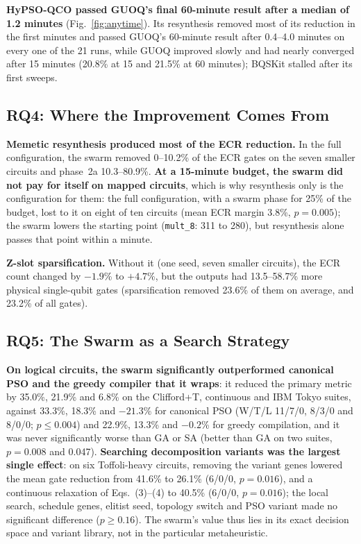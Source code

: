 \documentclass[conference,letterpaper]{IEEEtran}
\newcommand{\cir}[1]{\texttt{#1}}
\newcommand{\hypso}{HyPSO-QCO}
\begin{document}
\textbf{\hypso{} passed GUOQ's final 60-minute result after a median of 1.2 minutes} (Fig.~\ref{fig:anytime}).
Its resynthesis removed most of its reduction in the first minutes and passed GUOQ's 60-minute result after
0.4--4.0 minutes on every one of the 21 runs, while GUOQ improved slowly and had nearly converged after
15 minutes (20.8\% at 15 and 21.5\% at 60 minutes); BQSKit stalled after its first sweeps.

\subsection{RQ4: Where the Improvement Comes From}\label{sec:rq4}
\textbf{Memetic resynthesis produced most of the ECR reduction.} In the full configuration, the swarm removed
0--10.2\% of the ECR gates on the seven smaller circuits and phase~2a 10.3--80.9\%. \textbf{At a 15-minute
budget, the swarm did not pay for itself on mapped circuits}, which is why resynthesis only is the
configuration for them: the full configuration, with a swarm phase for 25\% of the budget, lost to it on
eight of ten circuits (mean ECR margin 3.8\%, $p = 0.005$); the swarm lowers the starting point
(\cir{mult\_8}: 311 to 280), but resynthesis alone passes that point within a minute.

\textbf{Z-slot sparsification.} Without it (one seed, seven smaller circuits), the ECR count changed by
$-1.9$\% to $+4.7$\%, but the outputs had 13.5--58.7\% more physical single-qubit gates (sparsification
removed 23.6\% of them on average, and 23.2\% of all gates).

\subsection{RQ5: The Swarm as a Search Strategy}
\textbf{On logical circuits, the swarm significantly outperformed canonical PSO and the greedy compiler that
it wraps}: it reduced the primary metric by 35.0\%, 21.9\% and 6.8\% on the Clifford+T, continuous and IBM
Tokyo suites, against 33.3\%, 18.3\% and $-21.3$\% for canonical PSO (W/T/L 11/7/0, 8/3/0 and 8/0/0;
$p \le 0.004$) and 22.9\%, 13.3\% and $-0.2$\% for greedy compilation, and it was never significantly worse
than GA or SA (better than GA on two suites, $p = 0.008$ and 0.047). \textbf{Searching decomposition variants
was the largest single effect}: on six Toffoli-heavy circuits, removing the variant genes lowered the mean
gate reduction from 41.6\% to 26.1\% (6/0/0, $p = 0.016$), and a continuous relaxation of Eqs.~(3)--(4) to
40.5\% (6/0/0, $p = 0.016$); the local search, schedule genes, elitist seed, topology switch and PSO variant
made no significant difference ($p \ge 0.16$). The swarm's value thus lies in its exact decision space and
variant library, not in the particular metaheuristic.
\end{document}
